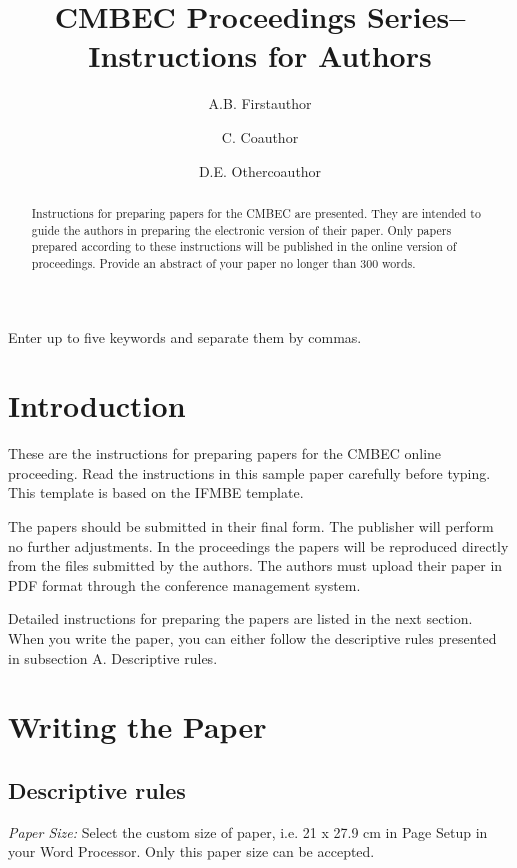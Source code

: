 \documentclass[nouppercase]{cmbec}
\title{CMBEC Proceedings Series-- Instructions for Authors}
\affiliation{Institution/Department, Affiliation, City, Country }{FIRSTAFF}
\affiliation{Institution/Department, Affiliation, City, Country }{SECONDAFF}
\author{A.B. Firstauthor}{FIRSTAFF}
\author{C. Coauthor}{SECONDAFF}
\author{D.E. Othercoauthor}{FIRSTAFF}
\begin{document}
\maketitle

\begin{abstract}
Instructions for preparing papers for the CMBEC are presented. They are intended to guide the authors in preparing the electronic version of their paper. Only papers prepared according to these instructions will be published in the online version of proceedings. Provide an abstract of your paper no longer than 300 words. 

\end{abstract}

\begin{keywords}
Enter up to five keywords and separate them by commas.
\end{keywords}

\section{Introduction}

These are the instructions for preparing papers for the CMBEC online proceeding. Read the instructions in this sample paper carefully before typing. This template is based on the IFMBE template.

The papers should be submitted in their final form. The publisher will perform no further adjustments. In the proceedings the papers will be reproduced directly from the files submitted by the authors. The authors  must upload their paper in PDF format through the conference management system.

Detailed instructions for preparing the papers are listed in the next section. When you write the paper, you can either follow the descriptive rules presented in subsection A. Descriptive rules.

\section{Writing the Paper}

\subsection{Descriptive rules}

\textit{Paper Size:} Select the custom size of paper, i.e. 21 x 27.9 cm in Page Setup in your Word Processor. Only this paper size can be accepted.
\end{document}
